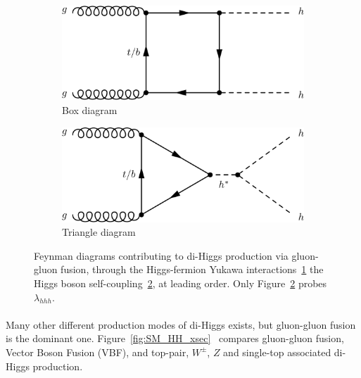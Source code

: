 \begin{figure}[h!]
\centering
\captionsetup{justification=centering}
    \begin{subfigure}[b]{0.4\textwidth}
        \includegraphics[width=\textwidth]{figures/theory/SM_HH_box}
        \caption{Box diagram}
        \label{fig:SM_HH_box}
    \end{subfigure}
    \quad
    \begin{subfigure}[b]{0.4\textwidth}
        \includegraphics[width=\textwidth]{figures/theory/SM_HH_tri}
        \caption{Triangle diagram}
        \label{fig:SM_HH_tri}
    \end{subfigure}
\caption{Feynman diagrams contributing to di-Higgs production via gluon-gluon fusion, through the Higgs-fermion Yukawa interactions~\ref{fig:SM_HH_box} the Higgs boson self-coupling~\ref{fig:SM_HH_tri}, at leading order. Only Figure~\ref{fig:SM_HH_tri} probes $\lambda_{hhh}$.}
\label{fig:SM_HH}
\end{figure}

\paragraph{}
Many other different production modes of di-Higgs exists, but gluon-gluon fusion is the dominant one. Figure~\ref{fig:SM_HH_xsec}~\cite{Frederix:2014hta} compares gluon-gluon fusion, Vector Boson Fusion (VBF), and top-pair, $W^{\pm}$, $Z$ and single-top associated di-Higgs production.

